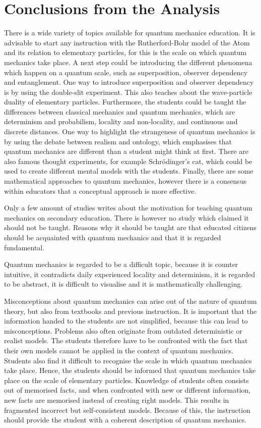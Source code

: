 \documentclass[11pt,twoside]{report} %
\begin{document}
\section{Conclusions from the Analysis}

There is a wide variety of topics available for quantum mechanics education. It is advisable to start any instruction with the Rutherford-Bohr model of the Atom and its relation to elementary particles, for this is the scale on which quantum mechanics take place. A next step could be introducing the different phenomena which happen on a quantum scale, such as superposition, observer dependency and entanglement. One way to introduce superposition and observer dependency is by using the double-slit experiment. This also teaches about the wave-particle duality of elementary particles. Furthermore, the students could be taught the differences between classical mechanics and quantum mechanics, which are determinism and probabilism, locality and non-locality, and continuous and discrete distances. One way to highlight the strangeness of quantum mechanics is by using the debate between realism and ontology, which emphasises that quantum mechanics are different than a student might think at first. There are also famous thought experiments, for example Schrödinger's cat, which could be used to create different mental models with the students. Finally, there are some mathematical approaches to quantum mechanics, however there is a consensus within educators that a conceptual approach is more effective.

Only a few amount of studies writes about the motivation for teaching quantum mechanics on secondary education. There is however no study which claimed it should not be taught. Reasons why it should be taught are that educated citizens should be acquainted with quantum mechanics and that it is regarded fundamental.

Quantum mechanics is regarded to be a difficult topic, because it is counter intuitive, it contradicts daily experienced locality and determinism, it is regarded to be abstract, it is difficult to visualise and it is mathematically challenging.

Misconceptions about quantum mechanics can arise out of the nature of quantum theory, but also from textbooks and previous instruction. It is important that the information handed to the students are not simplified, because this can lead to misconceptions. Problems also often originate from outdated deterministic or realist models. The students therefore have to be confronted with the fact that their own models cannot be applied in the context of quantum mechanics. Students also find it difficult to recognise the scale in which quantum mechanics take place. Hence, the students should be informed that quantum mechanics take place on the scale of elementary particles. Knowledge of students often consists out of memorised facts, and when confronted with new or different information, new facts are memorised instead of creating right models. This results in fragmented incorrect but self-consistent models. Because of this, the instruction should provide the student with a coherent description of quantum mechanics.
\end{document}
